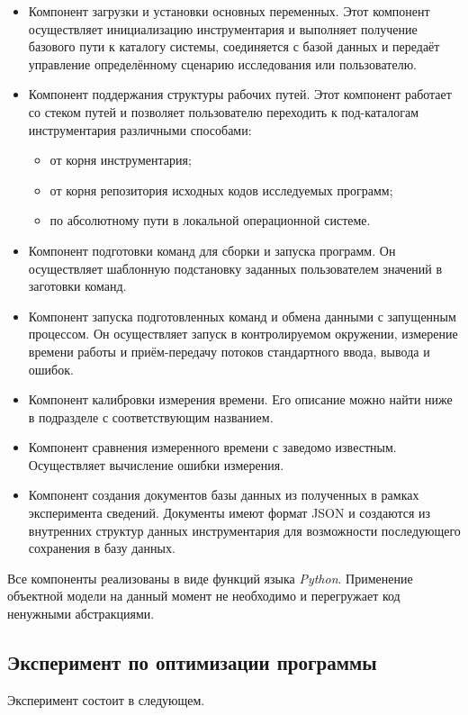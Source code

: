 \begin{itemize}
    \item Компонент загрузки и установки основных переменных. Этот компонент осуществляет инициализацию инструментария и выполняет получение базового пути к каталогу системы, соединяется с базой данных и передаёт управление определённому сценарию исследования или пользователю.
    \item Компонент поддержания структуры рабочих путей. Этот компонент работает со стеком путей и позволяет пользователю переходить к под-каталогам инструментария различными способами:
    \begin{itemize}
        \item от корня инструментария;
        \item от корня репозитория исходных кодов исследуемых программ;
        \item по абсолютному пути в локальной операционной системе.
    \end{itemize}
    \item Компонент подготовки команд для сборки и запуска программ. Он осуществляет шаблонную подстановку заданных пользователем значений в заготовки команд.
    \item Компонент запуска подготовленных команд и обмена данными с запущенным процессом. Он осуществляет запуск в контролируемом окружении, измерение времени работы и приём-передачу потоков стандартного ввода, вывода и ошибок.
    \item Компонент калибровки измерения времени. Его описание можно найти ниже в подразделе с соответствующим названием.
    \item Компонент сравнения измеренного времени с заведомо известным. Осуществляет вычисление ошибки измерения.
    \item Компонент создания документов базы данных из полученных в рамках эксперимента сведений. Документы имеют формат JSON \cite{json} и создаются из внутренних структур данных инструментария для возможности последующего сохранения в базу данных.
\end{itemize}

Все компоненты реализованы в виде функций языка \textit{Python}. Применение объектной модели на данный момент не необходимо и перегружает код ненужными абстракциями.


\subsection{Эксперимент по оптимизации программы}
Эксперимент состоит в следующем.

